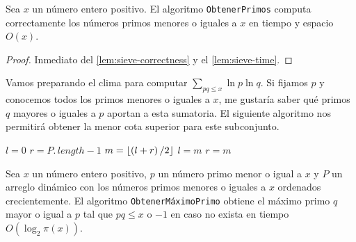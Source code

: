 \begin{theorem}
    \label{thm:sieve}
    Sea \(x\) un n\'umero entero positivo.
    El algoritmo \texttt{ObtenerPrimos}
    computa correctamente los n\'umeros primos
    menores o iguales a \(x\) en tiempo y espacio \(O(x)\).
\end{theorem}

\begin{proof}
    Inmediato del \cref{lem:sieve-correctness} y el \cref{lem:sieve-time}.
\end{proof}

Vamos preparando el clima para computar \(\sum_{pq \leq x} \ln p \ln q\).
Si fijamos \(p\) y conocemos todos los primos menores o iguales a \(x\),
me gustar\'ia saber qu\'e primos \(q\) mayores o iguales a \(p\) aportan a esta sumatoria.
El siguiente algoritmo nos permitir\'a obtener la menor cota superior
para este subconjunto.

\begin{algorithm}[H]
    \SetAlgoLined
    \DontPrintSemicolon
     {
        \(l = 0\)\;
        \(r = P.\,length - 1\)\;
         {
        }
         {
        }
         {
            \(m = \left\lfloor \left( l + r \right) / 2 \right\rfloor\)\;
             {
                \(l = m\)\;
            }
            {
                \(r = m\)\;
            }
        }
    }
    \caption{Retorna el m\'aximo primo \(q\) mayor o igual a \(p\) tal que \(pq \leq x\).}
\end{algorithm}

\begin{theorem}
    \label{thm:binary-search}
    Sea \(x\) un n\'umero entero positivo,
    \(p\) un n\'umero primo menor o igual a \(x\) y
    \(P\) un arreglo din\'amico con los n\'umeros primos menores o iguales a \(x\) ordenados crecientemente.
    El algoritmo \texttt{ObtenerM\'aximoPrimo}
    obtiene el m\'aximo primo \(q\)
    mayor o igual a \(p\) tal que
    \(pq \leq x\)
    o \(-1\) en caso no exista
    en tiempo \(O(\log_2 \pi(x))\).
\end{theorem}

